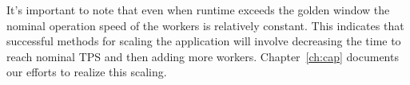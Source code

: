 It's important to note that even when runtime exceeds the golden window the nominal operation speed of the workers is relatively constant.
This indicates that successful methods for scaling the application will involve decreasing the time to reach nominal TPS and then adding more workers.
Chapter~\ref{ch:cap} documents our efforts to realize this scaling.

